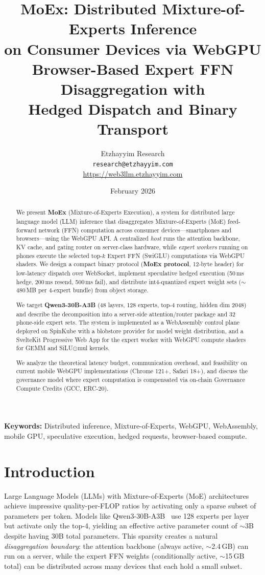 \documentclass[11pt,a4paper]{article}
\title{%
  \textbf{MoEx: Distributed Mixture-of-Experts Inference\\
  on Consumer Devices via WebGPU}\\[0.5em]
  \large Browser-Based Expert FFN Disaggregation with\\
  Hedged Dispatch and Binary Transport
}
\author{
  Etzhayyim Research\\
  \texttt{research@etzhayyim.com}\\
  \url{https://web3llm.etzhayyim.com}
}
\date{February 2026}
\begin{document}
\maketitle

\begin{abstract}
We present \textbf{MoEx} (Mixture-of-Experts Execution), a system for
distributed large language model (LLM) inference that disaggregates
Mixture-of-Experts (MoE) feed-forward network (FFN) computation across
consumer devices---smartphones and browsers---using the WebGPU API.
A centralized \emph{host} runs the attention backbone, KV cache, and
gating router on server-class hardware, while \emph{expert workers}
running on phones execute the selected top-$k$ Expert FFN (SwiGLU)
computations via WebGPU shaders. We design a compact binary protocol
(\textbf{MoEx protocol}, 12-byte header) for low-latency dispatch over
WebSocket, implement speculative hedged execution (50\,ms hedge,
200\,ms resend, 500\,ms fail), and distribute int4-quantized expert
weight sets ($\sim$480\,MB per 4-expert bundle) from object storage.

We target \textbf{Qwen3-30B-A3B} (48 layers, 128 experts, top-4
routing, hidden dim 2048) and describe the decomposition into a
server-side attention/router package and 32 phone-side expert sets.
The system is implemented as a WebAssembly control plane deployed on
SpinKube
with a blobstore provider for model weight distribution, and a
SvelteKit Progressive Web App for the expert worker with WebGPU
compute shaders for GEMM and SiLU$\odot$mul kernels.

We analyze the theoretical latency budget, communication overhead, and
feasibility on current mobile WebGPU implementations (Chrome 121+,
Safari 18+), and discuss the governance model where expert computation
is compensated via on-chain Governance Compute Credits (GCC, ERC-20).
\end{abstract}

\textbf{Keywords:} Distributed inference, Mixture-of-Experts, WebGPU,
WebAssembly, mobile GPU, speculative execution, hedged requests,
browser-based compute.

\section{Introduction}
\label{sec:intro}

Large Language Models (LLMs) with Mixture-of-Experts (MoE)
architectures~\cite{shazeer2017outrageously,fedus2022switch} achieve
impressive quality-per-FLOP ratios by activating only a sparse subset
of parameters per token. Models like Qwen3-30B-A3B~\cite{qwen3} use
128 experts per layer but activate only the top-4, yielding an
effective active parameter count of $\sim$3B despite having 30B total
parameters. This sparsity creates a natural \emph{disaggregation
boundary}: the attention backbone (always active, $\sim$2.4\,GB) can
run on a server, while the expert FFN weights (conditionally active,
$\sim$15\,GB total) can be distributed across many devices that each
hold a small subset.
\end{document}
